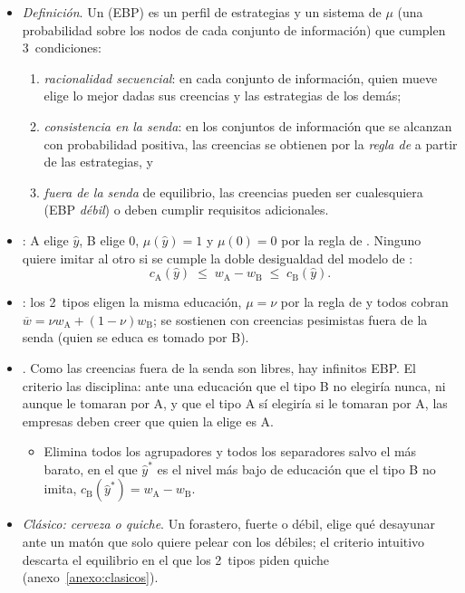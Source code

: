 \documentclass[11pt]{article}
\begin{document}
\begin{itemize}
\item \emph{Definición}. Un  (EBP) es un perfil de estrategias y un sistema de  $\mu$ (una probabilidad sobre los nodos de cada conjunto de información) que cumplen 3~condiciones:
  \begin{enumerate}
  \item \emph{racionalidad secuencial}: en cada conjunto de información, quien mueve elige lo mejor dadas sus creencias y las estrategias de los demás;
  \item \emph{consistencia en la senda}: en los conjuntos de información que se alcanzan con probabilidad positiva, las creencias se obtienen por la \emph{regla de } a partir de las estrategias, y
  \item \emph{fuera de la senda} de equilibrio, las creencias pueden ser cualesquiera (EBP \emph{débil}) o deben cumplir requisitos adicionales.
  \end{enumerate}
\item {}: A elige $\hat y$, B elige 0, $\mu(\hat y)=1$ y $\mu(0)=0$ por la regla de . Ninguno quiere imitar al otro si se cumple la doble desigualdad del modelo de  :
\[
c_{\mathrm A}(\hat y)\;\leq\;w_{\mathrm A}-w_{\mathrm B}\;\leq\;c_{\mathrm B}(\hat y).
\]
\item {}: los 2~tipos eligen la misma educación, $\mu=\nu$ por la regla de  y todos cobran $\overline w=\nu w_{\mathrm A}+(1-\nu)w_{\mathrm B}$; se sostienen con creencias pesimistas fuera de la senda (quien se educa es tomado por B).
\item {}\nocite{ChoKreps1987Signaling}. Como las creencias fuera de la senda son libres, hay infinitos EBP. El criterio las disciplina: ante una educación que el tipo B no elegiría nunca, ni aunque le tomaran por A, y que el tipo A sí elegiría si le tomaran por A, las empresas deben creer que quien la elige es A.
  \begin{itemize}
  \item Elimina todos los agrupadores y todos los separadores salvo el más barato, en el que $\hat y^*$ es el nivel más bajo de educación que el tipo B no imita, $c_{\mathrm B}(\hat y^*)=w_{\mathrm A}-w_{\mathrm B}$\nocite{MasColellWhinstonGreen1995}.
  \end{itemize}
\item \emph{Clásico: cerveza o quiche}\nocite{ChoKreps1987Signaling}. Un forastero, fuerte o débil, elige qué desayunar ante un matón que solo quiere pelear con los débiles; el criterio intuitivo descarta el equilibrio en el que los 2~tipos piden quiche (anexo~\ref{anexo:clasicos}).
\end{itemize}
\end{document}
